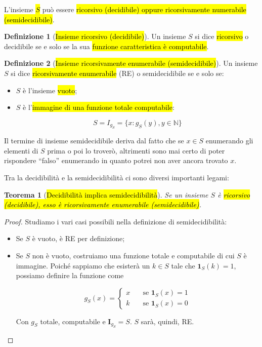 \documentclass[a4paper,11pt,twoside]{article}
\theoremstyle{plain}
\newtheorem{thm}{Teorema}[section]
\theoremstyle{definition}
\newtheorem{defn}{Definizione}[section]
\theoremstyle{remark}
\begin{document}
L'insieme \hl{$S$} può essere \hl{ricorsivo (decidibile) oppure ricorsivamente
numerabile (semidecidibile)}.

\begin{defn}[\hl{Insieme ricorsivo (decidibile)}]\label{def:insieme-decidibile}
  Un insieme $S$ si dice \hl{ricorsivo} o decidibile se e solo se la sua
  \hl{funzione caratteristica è computabile}.
\end{defn}

\begin{defn}[\hl{Insieme ricorsivamente enumerabile (semidecidibile)}]\label{def:insieme-semidecidibile}
  Un insieme $S$ si dice \hl{ricorsivamente enumerabile} (RE) o semidecidibile
  se e solo se:

  \begin{itemize}
    \item $S$ è l'insieme \hl{vuoto};
    \item $S$ è l'\hl{immagine di una funzione totale computabile}:

      \begin{equation}
        S = I_{g_S} = \{ x: g_S(y), y \in \mathbb{N} \}
      \end{equation}
  \end{itemize}
\end{defn}

Il termine di insieme semidecidibile deriva dal fatto che se $x \in S$
enumerando gli elementi di $S$ prima o poi lo troverò, altrimenti sono mai certo
di poter rispondere ``falso'' enumerando in quanto potrei non aver ancora
trovato $x$.

Tra la decidibilità e la semidecidibilità ci sono diversi importanti legami:

\begin{thm}[\hl{Decidibilità implica semidecidibilità}]\label{thm:dec-semidec}
  Se un insieme $S$ è \hl{ricorsivo (decidibile), esso è ricorsivamente
  enumerabile (semidecidibile)}.
\end{thm}
\begin{proof}
  Studiamo i vari casi possibili nella definizione di semidecidibilità:

  \begin{itemize}
    \item Se $S$ è vuoto, è RE per definizione;
    \item Se $S$ non è vuoto, costruiamo una funzione totale e computabile di
      cui $S$ è immagine. Poiché sappiamo che esisterà un $k \in S$ tale che
      $\mathbf{1}_S(k) = 1$, possiamo definire la funzione come

      \[
        g_S(x) =
        \begin{cases}
          x & \quad \text{se } \mathbf{1}_S(x) = 1 \\
          k & \quad \text{se } \mathbf{1}_S(x) = 0
        \end{cases}
      \]

      Con $g_S$ totale, computabile e $\mathbf{I}_{g_S} = S$. $S$ sarà, quindi,
      RE\@.
  \end{itemize}
\end{proof}
\end{document}
